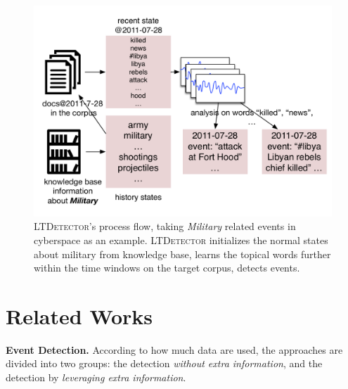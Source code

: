 \documentclass{article}
\begin{document}
\begin{figure}[h]
    \centering
    \includegraphics[width=.82\columnwidth]{img/NSDetectorExample.pdf}
    \caption{\textsc{LTDetector}'s process flow, taking \textit{Military} related events in cyberspace as an example. \textsc{LTDetector} initializes the normal states about military from knowledge base, learns the topical words further within the time windows on the target corpus, detects events.}
    \label{fig:modelDesc}
\end{figure}




\section{Related Works}
\label{sec:relatedWorks}
\textbf{Event Detection.} According to how much data are used, the approaches are divided into two groups: the detection \textit{without extra information}, and the detection by \textit{leveraging extra information}. 
\end{document}
